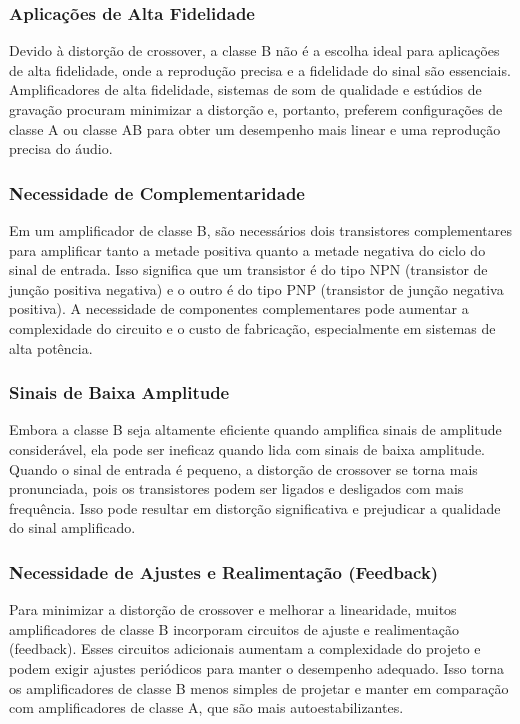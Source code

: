 \subsubsection{Aplicações de Alta Fidelidade}

Devido à distorção de crossover, a classe B não é a escolha ideal para aplicações de alta fidelidade, onde a reprodução precisa e a fidelidade do sinal são essenciais. Amplificadores de alta fidelidade, sistemas de som de qualidade e estúdios de gravação procuram minimizar a distorção e, portanto, preferem configurações de classe A ou classe AB para obter um desempenho mais linear e uma reprodução precisa do áudio.

\subsubsection{Necessidade de Complementaridade}

Em um amplificador de classe B, são necessários dois transistores complementares para amplificar tanto a metade positiva quanto a metade negativa do ciclo do sinal de entrada. Isso significa que um transistor é do tipo NPN (transistor de junção positiva negativa) e o outro é do tipo PNP (transistor de junção negativa positiva). A necessidade de componentes complementares pode aumentar a complexidade do circuito e o custo de fabricação, especialmente em sistemas de alta potência.

\subsubsection{Sinais de Baixa Amplitude}

Embora a classe B seja altamente eficiente quando amplifica sinais de amplitude considerável, ela pode ser ineficaz quando lida com sinais de baixa amplitude. Quando o sinal de entrada é pequeno, a distorção de crossover se torna mais pronunciada, pois os transistores podem ser ligados e desligados com mais frequência. Isso pode resultar em distorção significativa e prejudicar a qualidade do sinal amplificado.

\subsubsection{Necessidade de Ajustes e Realimentação (Feedback)}

Para minimizar a distorção de crossover e melhorar a linearidade, muitos amplificadores de classe B incorporam circuitos de ajuste e realimentação (feedback). Esses circuitos adicionais aumentam a complexidade do projeto e podem exigir ajustes periódicos para manter o desempenho adequado. Isso torna os amplificadores de classe B menos simples de projetar e manter em comparação com amplificadores de classe A, que são mais autoestabilizantes.